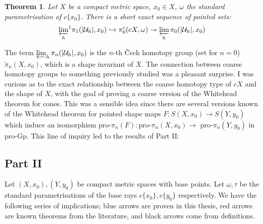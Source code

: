 \documentclass[a4paper,11pt]{article}
\theoremstyle{definition}
\theoremstyle{plain}
\newtheorem*{theorem*}{Theorem}
\theoremstyle{remark}
\begin{document}
\begin{theorem*}  Let $X$ be a compact metric space, $x_0\in X$, $\omega$ the standard parametrisation of $c\{x_0\}$. There is a short exact sequence of pointed sets:
\begin{align*}
 {\varprojlim_h}^1  \pi_{1}(|\mathcal{U}_{h}|,x_0) \hookrightarrow  \pi^{c}_{0}(cX,\omega) \twoheadrightarrow \varprojlim_{h} \pi_0 (|\mathcal{U}_{h}|,x_0) 
\end{align*}
\end{theorem*}

The term  $\varprojlim_{h} \pi_{n}(|\mathcal{U}_{h}|,x_0)$ is the $n$-th \v{C}ech homotopy group (set for $n=0$) $\check{\pi}_n(X,x_0)$, which is a shape invariant of $X$. The connection between coarse homotopy groups to something previously studied was a pleasant surprise. I was curious as to the exact relationship between the coarse homotopy type of $cX$ and the shape of $X$, with the goal of proving a coarse version of the Whitehead theorem for cones. This was a sensible idea since there are several versions known of the Whitehead theorem for pointed shape maps $F: S(X,x_0)\rightarrow S(Y,y_0)$ which induce an isomorphism pro-$\pi_{n}(F):$pro-$\pi_{n}(X,x_0)\rightarrow$ pro-$\pi_{n}(Y,y_0)$ in pro-Gp. This line of inquiry led to the results of Part II:

\subsection{Part II}




Let $(X,x_0), (Y,y_0)$ be compact metric spaces with base points. Let $\omega,\tau$ be the standard parametrisations of the base rays $c\{x_0\},c\{y_0\}$ respectively. We have the following series of implications; blue arrows are proven in this thesis, red arrows are known theorems from the literature, and black arrows come from definitions. 
\end{document}
